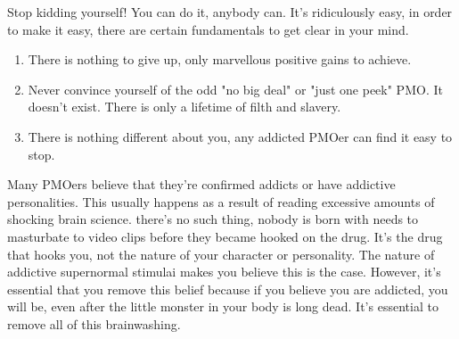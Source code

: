 \documentclass[easypeasy.tex]{subfiles}
\begin{document}
Stop kidding yourself! You can do it, anybody can. It's ridiculously easy, in order to make it easy, there are certain fundamentals to get clear in your mind.

\begin{enumerate}
  \item There is nothing to give up, only marvellous positive gains to achieve.
  \item Never convince yourself of the odd "no big deal" or "just one peek" PMO. It doesn't exist. There is only a lifetime of filth and slavery.
  \item There is nothing different about you, any addicted PMOer can find it easy to stop.
\end{enumerate}

Many PMOers believe that they're confirmed addicts or have addictive personalities. This usually happens as a result of reading excessive amounts of shocking brain science. there's no such thing, nobody is born with needs to masturbate to video clips before they became hooked on the drug. It's the drug that hooks you, not the nature of your character or personality. The nature of addictive supernormal stimulai makes you believe this is the case. However, it's essential that you remove this belief because if you believe you are addicted, you will be, even after the little monster in your body is long dead. It's essential to remove all of this brainwashing.
\end{document}
